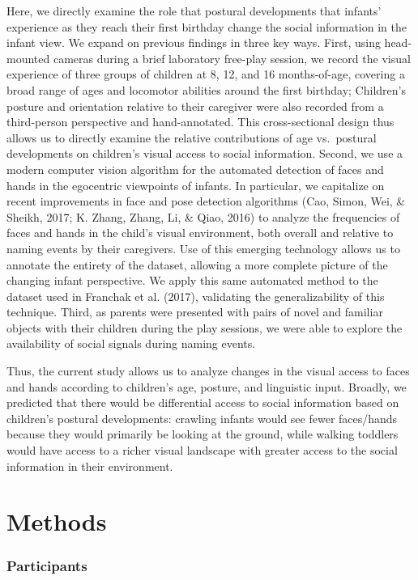 \documentclass[english,man]{apa6}
\begin{document}
Here, we directly examine the role that postural developments that
infants' experience as they reach their first birthday change the social
information in the infant view. We expand on previous findings in three
key ways. First, using head-mounted cameras during a brief laboratory
free-play session, we record the visual experience of three groups of
children at 8, 12, and 16 months-of-age, covering a broad range of ages
and locomotor abilities around the first birthday; Children's posture
and orientation relative to their caregiver were also recorded from a
third-person perspective and hand-annotated. This cross-sectional design
thus allows us to directly examine the relative contributions of age
vs.~postural developments on children's visual access to social
information. Second, we use a modern computer vision algorithm for the
automated detection of faces and hands in the egocentric viewpoints of
infants. In particular, we capitalize on recent improvements in face and
pose detection algorithms (Cao, Simon, Wei, \& Sheikh, 2017; K. Zhang,
Zhang, Li, \& Qiao, 2016) to analyze the frequencies of faces and hands
in the child's visual environment, both overall and relative to naming
events by their caregivers. Use of this emerging technology allows us to
annotate the entirety of the dataset, allowing a more complete picture
of the changing infant perspective. We apply this same automated method
to the dataset used in Franchak et al. (2017), validating the
generalizability of this technique. Third, as parents were presented
with pairs of novel and familiar objects with their children during the
play sessions, we were able to explore the availability of social
signals during naming events.

Thus, the current study allows us to analyze changes in the visual
access to faces and hands according to children's age, posture, and
linguistic input. Broadly, we predicted that there would be differential
access to social information based on children's postural developments:
crawling infants would see fewer faces/hands because they would
primarily be looking at the ground, while walking toddlers would have
access to a richer visual landscape with greater access to the social
information in their environment.

\section{Methods}\label{methods}

\subsubsection{Participants}\label{participants}
\end{document}
